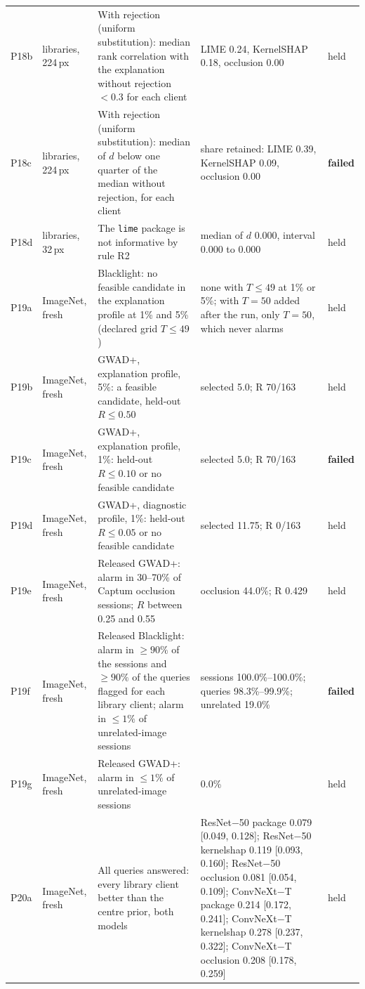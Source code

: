 \begin{footnotesize}
\begin{longtable}{L{0.9cm}L{1.9cm}L{5.0cm}L{3.4cm}L{1.1cm}}
P18b & libraries, 224\,px & With rejection (uniform substitution): median rank correlation with the explanation without rejection $<0.3$ for each client & LIME 0.24, KernelSHAP 0.18, occlusion 0.00 & held \\
P18c & libraries, 224\,px & With rejection (uniform substitution): median of $d$ below one quarter of the median without rejection, for each client & share retained: LIME 0.39, KernelSHAP 0.09, occlusion 0.00 & \textbf{failed} \\
P18d & libraries, 32\,px & The \texttt{lime} package is not informative by rule R2 & median of $d$ 0.000, interval 0.000 to 0.000 & held \\
P19a & ImageNet, fresh & Blacklight: no feasible candidate in the explanation profile at 1\% and 5\% (declared grid $T\le49$) & none with $T\le49$ at 1\% or 5\%; with $T=50$ added after the run, only $T=50$, which never alarms & held \\
P19b & ImageNet, fresh & GWAD+, explanation profile, 5\%: a feasible candidate, held-out $R\le0.50$ & selected 5.0; R 70/163 & held \\
P19c & ImageNet, fresh & GWAD+, explanation profile, 1\%: held-out $R\le0.10$ or no feasible candidate & selected 5.0; R 70/163 & \textbf{failed} \\
P19d & ImageNet, fresh & GWAD+, diagnostic profile, 1\%: held-out $R\le0.05$ or no feasible candidate & selected 11.75; R 0/163 & held \\
P19e & ImageNet, fresh & Released GWAD+: alarm in 30--70\% of Captum occlusion sessions; $R$ between 0.25 and 0.55 & occlusion 44.0\%; R 0.429 & held \\
P19f & ImageNet, fresh & Released Blacklight: alarm in $\ge90\%$ of the sessions and $\ge90\%$ of the queries flagged for each library client; alarm in $\le1\%$ of unrelated-image sessions & sessions 100.0\%--100.0\%; queries 98.3\%--99.9\%; unrelated 19.0\% & \textbf{failed} \\
P19g & ImageNet, fresh & Released GWAD+: alarm in $\le1\%$ of unrelated-image sessions & 0.0\% & held \\
P20a & ImageNet, fresh & All queries answered: every library client better than the centre prior, both models & ResNet$-$50 package 0.079 [0.049, 0.128]; ResNet$-$50 kernelshap 0.119 [0.093, 0.160]; ResNet$-$50 occlusion 0.081 [0.054, 0.109]; ConvNeXt$-$T package 0.214 [0.172, 0.241]; ConvNeXt$-$T kernelshap 0.278 [0.237, 0.322]; ConvNeXt$-$T occlusion 0.208 [0.178, 0.259] & held \\

\end{longtable}
\end{footnotesize}
